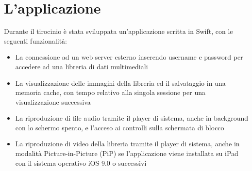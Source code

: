 \chapter{L'applicazione}
Durante il tirocinio è stata sviluppata un'applicazione scritta in Swift, con le seguenti funzionalità:
\begin{itemize}
\item La connessione ad un web server esterno inserendo username e password per accedere ad una libreria di dati multimediali
\item La visualizzazione delle immagini della libreria ed il salvataggio in una memoria cache, con tempo relativo alla singola sessione per una visualizzazione successiva
\item La riproduzione di file audio tramite il player di sistema, anche in background con lo schermo spento, e l'acceso ai controlli sulla schermata di blocco
\item La riproduzione di video della libreria tramite il player di sistema, anche in modalità Picture-in-Picture (PiP) se l'applicazione viene installata su iPad con il sistema operativo iOS 9.0 o successivi
\end{itemize}
